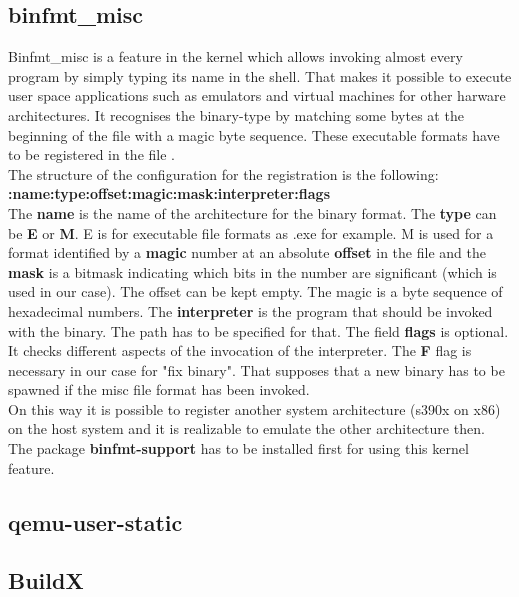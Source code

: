 \subsection{binfmt\_misc}

Binfmt\_misc is a feature in the kernel which allows invoking almost every program by simply typing its name in the shell. That makes it possible to execute user space applications such as emulators and virtual machines for other harware architectures. It recognises the binary-type by matching some bytes at the beginning of the file with a magic byte sequence. These executable formats have to be registered in the file .\\
The structure of the configuration for the registration is the following: \\ \textbf{:name:type:offset:magic:mask:interpreter:flags} \\

The \textbf{name} is the name of the architecture for the binary format. The \textbf{type} can be \textbf{E} or \textbf{M}. E is for executable file formats as .exe for example. M is used for a format identified by a \textbf{magic} number at an absolute \textbf{offset} in the file and the \textbf{mask} is a bitmask indicating which bits in the number are significant\cite{Slackware2020} (which is used in our case). 
The offset can be kept empty. The magic is a byte sequence of hexadecimal numbers. The \textbf{interpreter} is the program that should be invoked with the binary\cite{Guenther2020}. 
The path has to be specified for that. The field \textbf{flags} is optional. It checks different aspects of the invocation of the interpreter. The \textbf{F} flag is necessary in our case for "fix binary". 
That supposes that a new binary has to be spawned if the misc file format has been invoked.\\
On this way it is possible to register another system architecture (s390x on x86) on the host system and it is realizable to emulate the other architecture then. \\
The package \textbf{binfmt-support} has to be installed first for using this kernel feature. 

\subsection{qemu-user-static}

\subsection{BuildX}

